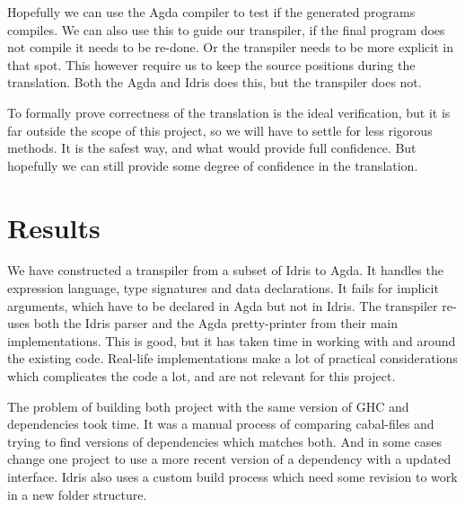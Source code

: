 \documentclass[parskip=half]{scrartcl}
\begin{document}
Hopefully we can use the Agda compiler to test if the generated programs
compiles. We can also use this to guide our transpiler, if the final
program does not compile it needs to be re-done. Or the transpiler needs to be
more explicit in that spot. This however require us to keep the source
positions during the translation. Both the Agda and Idris does this, but the
transpiler does not.

To formally prove correctness of the translation is the ideal verification, but
it is far outside the scope of this project, so we will have to settle for less
rigorous methods. It is the safest way, and what would provide full confidence.
But hopefully we can still provide some degree of confidence in the
translation.



\section{Results}

We have constructed a transpiler from a subset of Idris to Agda. It handles the
expression language, type signatures and data declarations.  It fails for
implicit arguments, which have to be declared in Agda but not in Idris. The
transpiler re-uses both the Idris parser and the Agda pretty-printer from their
main implementations.  This is good, but it has taken time in working with and
around the existing code.  Real-life implementations make a lot of practical
considerations which complicates the code a lot, and are not relevant for this
project.



The problem of building both project with the same version of GHC and
dependencies took time. It was a manual process of comparing cabal-files and
trying to find versions of dependencies which matches both. And in some cases
change one project to use a more recent version of a dependency with a updated
interface. Idris also uses a custom build process which need some revision to
work in a new folder structure.
\end{document}
